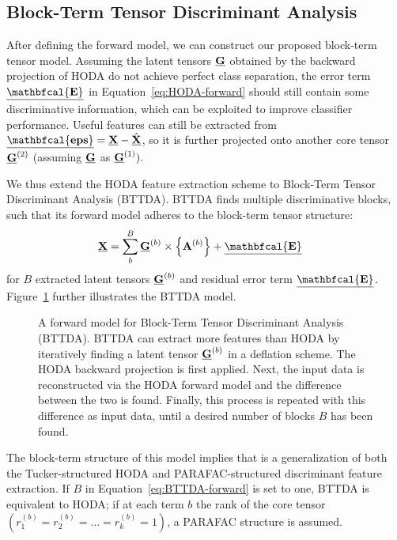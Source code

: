 \subsection{Block-Term Tensor Discriminant Analysis}
After defining the forward model, we can construct our proposed block-term
tensor model.
Assuming the latent tensors $\underline{\mathbf{G}}$
obtained by the backward projection of HODA do not achieve perfect
class separation, the error term $\ten{\mathbfcal{E}}$ in
Equation~\ref{eq:HODA-forward} should still contain some discriminative
information, which can be exploited to improve classifier
performance.
Useful features can still be extracted from $\ten{\mathbfcal{eps}} = \ten{X} -
\hat{\ten{X}}$, so it is further projected onto another core tensor
$\underline{\mathbf{G}}^{(2)}$ (assuming $\underline{\mathbf{G}}$ as $\underline{\mathbf{G}}^{(1)}).$

We thus extend the HODA feature extraction scheme to Block-Term Tensor Discriminant Analysis
(BTTDA).
BTTDA finds multiple discriminative blocks, such that its forward
model adheres to the block-term tensor structure:
\begin{align}
	\ten{X} & = \sum_b^B\ten{G}^{(b)}\mmpr{\mat{A}^{(b)}} + \ten{\mathbfcal{E}}
	\label{eq:BTTDA-forward}
\end{align}
for $B$ extracted latent tensors $\underline{\mathbf{G}}^{(b)}$ and residual error term
$\ten{\mathbfcal{E}}$.
Figure~\ref{fig:BTTDA} further illustrates the BTTDA model.
\begin{figure}[t]
	\centering
	
  \caption[A forward model for \ac{bttda}.]{A forward model for Block-Term Tensor Discriminant Analysis
		(BTTDA). BTTDA can extract more features
		than HODA by iteratively finding a latent tensor $\underline{\mathbf{G}}^{(b)}$ in a
		deflation scheme.
		The HODA backward projection is first applied. Next, the
		input data is reconstructed via the HODA forward model and the
		difference between the two is found.
		Finally, this process is repeated with this difference as input data, until a
		desired number of blocks $B$ has been found.}
	\label{fig:BTTDA}
\end{figure}
The block-term structure of this model implies that is a generalization of both
the Tucker-structured HODA and PARAFAC-structured discriminant feature
extraction.
If $B$ in Equation~\ref{eq:BTTDA-forward} is set to one, BTTDA is equivalent to
HODA; if at each term $b$ the rank of the core tensor
$(r_1^{(b)}=r_2^{(b)}=\ldots=r_k^{(b)}=1)$, a PARAFAC structure is assumed.

